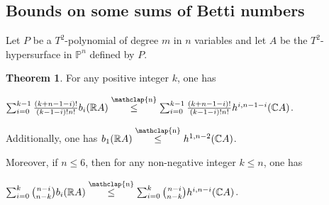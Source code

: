\documentclass[12pt]{article}
\newcommand\customeq{\stackrel{\mathclap{\normalfont\scriptsize\mbox{n}}}{=}}
\newcommand\customleq{\stackrel{\mathclap{\normalfont\scriptsize\mbox{n}}}{\leq}}
\newcommand{\R}{\mathbb{R}}
\newcommand{\C}{\mathbb{C}}
\renewcommand{\P}{\mathbb{P}}
\theoremstyle{definition}
\newtheorem{prop}{Proposition}[section]
\newtheorem{thm}{Theorem}[section]
\begin{document}
\label{section_proof_bounds}

\subsection{Bounds on some sums of Betti numbers}

\begin{sloppypar}
    Let $P$ be a $T^2$-polynomial of degree $m$ in $n$ variables and let $A$ be the $T^2$-hypersurface in $\P^n$ defined by $P$.
\end{sloppypar}



\begin{thm}
    \label{thm_partial_sums_betti_numbers}
    For any positive integer $k$, one has
    \begin{center}
    $\sum_{i=0}^{k-1} \frac{(k+n-1-i)!}{(k-1-i)!n!} b_i(\R A) \customleq %
    \sum_{i=0}^{k-1} \frac{(k+n-1-i)!}{(k-1-i)!n!} h^{i,n-1-i}(\C A)$.\end{center}
    
    Additionally, one has $b_1(\R A) \customleq h^{1,n-2}(\C A)$.

    Moreover, if $n \leq 6$, then for any non-negative integer $k\leq n$, one has
    \begin{center}$\sum_{i=0}^k { n-i \choose n-k } b_i(\R A) \customleq \sum_{i=0}^k { n-i \choose n-k } h^{i,n-i}(\C A)$.\end{center}
\end{thm}
\end{document}
